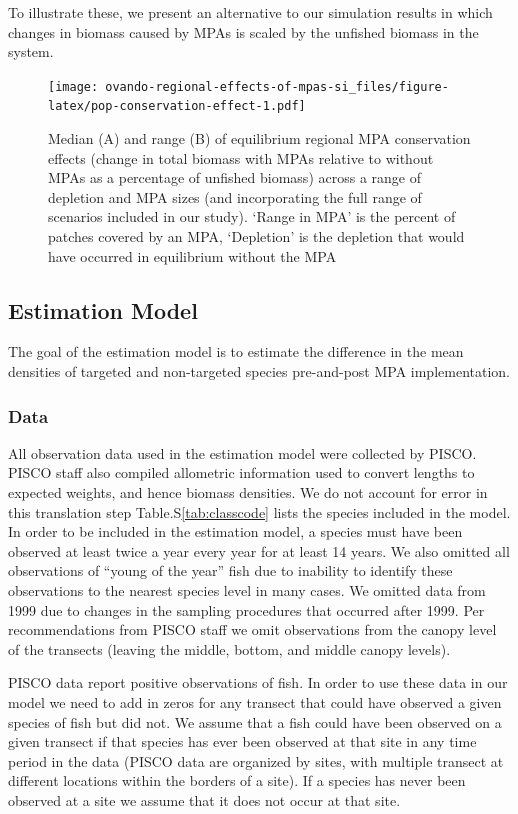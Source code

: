 \documentclass[]{article}
\begin{document}
To illustrate these, we present an alternative to our simulation results in which changes in biomass caused by MPAs is scaled by the unfished biomass in the system.

\begin{figure}
\centering
\texttt{[image: ovando-regional-effects-of-mpas-si\_files/figure-latex/pop-conservation-effect-1.pdf]}
\caption{\label{fig:pop-conservation-effect}Median (A) and range (B) of equilibrium regional MPA conservation effects (change in total biomass with MPAs relative to without MPAs as a percentage of unfished biomass) across a range of depletion and MPA sizes (and incorporating the full range of scenarios included in our study). `Range in MPA' is the percent of patches covered by an MPA, `Depletion' is the depletion that would have occurred in equilibrium without the MPA}
\end{figure}

\hypertarget{estimation-model}{%
\subsection{Estimation Model}\label{estimation-model}}

The goal of the estimation model is to estimate the difference in the mean densities of targeted and non-targeted species pre-and-post MPA implementation.

\hypertarget{data}{%
\subsubsection{Data}\label{data}}

All observation data used in the estimation model were collected by PISCO. PISCO staff also compiled allometric information used to convert lengths to expected weights, and hence biomass densities. We do not account for error in this translation step Table.S\ref{tab:classcode} lists the species included in the model. In order to be included in the estimation model, a species must have been observed at least twice a year every year for at least 14 years. We also omitted all observations of ``young of the year'' fish due to inability to identify these observations to the nearest species level in many cases. We omitted data from 1999 due to changes in the sampling procedures that occurred after 1999. Per recommendations from PISCO staff we omit observations from the canopy level of the transects (leaving the middle, bottom, and middle canopy levels).

PISCO data report positive observations of fish. In order to use these data in our model we need to add in zeros for any transect that could have observed a given species of fish but did not. We assume that a fish could have been observed on a given transect if that species has ever been observed at that site in any time period in the data (PISCO data are organized by sites, with multiple transect at different locations within the borders of a site). If a species has never been observed at a site we assume that it does not occur at that site.
\end{document}
